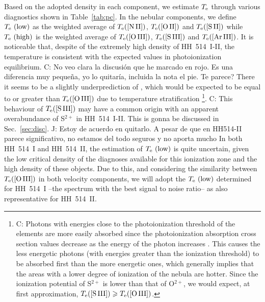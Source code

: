 \documentclass[fleqn,usenatbib]{mnras}
\newcommand{\jorge}[1]{{\color{magenta}J: #1}}
\newcommand{\cesar}[1]{{\color{red}C: #1}}
\begin{document}
Based on the adopted density in each component, we estimate $T_{\rm e}$ through various diagnostics shown in Table~\ref{tab:pc}. In the nebular components, we define $T_{\rm e} \text{ (low)}$ as the weighted average of $T_{\rm e} (\text{[N\thinspace II]})$, $T_{\rm e} (\text{[O\thinspace II]})$ and $T_{\rm e} (\text{[S\thinspace II]})$ while $T_{\rm e} \text{ (high)}$ is the weighted average of $T_{\rm e} (\text{[O\thinspace III]})$, $T_{\rm e} (\text{[S\thinspace III]})$ and $T_{\rm e} (\text{[Ar\thinspace III]})$. It is noticeable that, despite of the extremely high density of HH~514~I-II, the temperature is consistent with the expected values in photoionization equilibrium. \cesar{No veo clara la discusión que he marcado en rojo. Es una diferencia muy pequeña, yo lo quitaría, incluida la nota el pie. Te parece? There it seems to be a slightly underprediction of , which would be expected to be equal to or greater than $T_{\rm e}(\text{[O\thinspace III]})$ due to temperature stratification} \footnote{\cesar{Photons with energies close to the photoionization threshold of the elements are more easily absorbed since the photoionization absorption cross section values decrease as the energy of the photon increases \citep{osterbrock06}. This causes the less energetic photons (with energies greater than the ionization threshold) to be absorbed first than the more energetic ones, which generally implies that the areas with a lower degree of ionization of the nebula are hotter. Since the ionization potential of S$^{2+}$ is lower than that of O$^{2+}$, we would expect, at first approximation, $T_{\rm e}(\text{[S\thinspace III]})\geq T_{\rm e}(\text{[O\thinspace III]})$.}}. \cesar{This behaviour of $T_{\rm e}(\text{[S\thinspace III]})$ may have a common origin with an apparent overabundance of S$^{2+}$ in HH~514~I-II. This is gonna be discussed in Sec.~\ref{sec:disc}.} \jorge{Estoy de acuerdo en quitarlo. A pesar de que en HH514-II parece significativo, no estamos del todo seguros y no aporta mucho} In both HH~514~I and HH~514~II, the estimation of $T_{\rm e} \text{ (low)}$ is quite uncertain, given the low critical density of the diagnoses available for this ionization zone and the high density of these objects. Due to this, and considering the similarity between $T_{\rm e}(\text{[O\thinspace III]})$ in both velocity components, we will adopt the $T_{\rm e} \text{ (low)}$ determined for  HH~514~I --the spectrum with the best signal to noise ratio-- as also representative for  HH~514~II.
\end{document}
